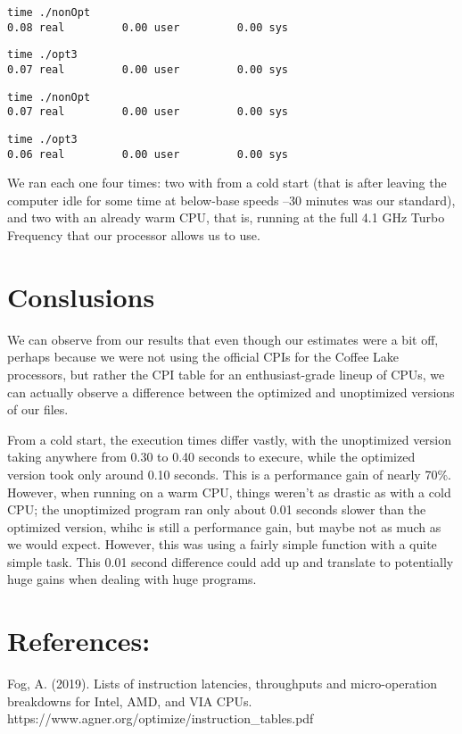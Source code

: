 \documentclass[a4paper]{article}
\begin{document}
\begin{lstlisting}
time ./nonOpt
0.08 real         0.00 user         0.00 sys
\end{lstlisting} 

\begin{lstlisting}
time ./opt3
0.07 real         0.00 user         0.00 sys
\end{lstlisting} 

\begin{lstlisting}
time ./nonOpt
0.07 real         0.00 user         0.00 sys
\end{lstlisting} 

\begin{lstlisting}
time ./opt3
0.06 real         0.00 user         0.00 sys
\end{lstlisting}

We ran each one four times: two with from a cold start (that is after leaving the computer idle for some time at below-base speeds 
--30 minutes was our standard), and two with an already warm CPU, that is, running at the full 4.1 GHz Turbo Frequency that our processor 
allows us to use.

\section{Conslusions}

We can observe from our results that even though our estimates were a bit off, perhaps because we were not using the official CPIs for the
Coffee Lake processors, but rather the CPI table for an enthusiast-grade lineup of CPUs, we can actually observe a difference between the optimized 
and unoptimized versions of our files.

From a cold start, the execution times differ vastly, with the unoptimized version taking anywhere from 0.30 to 0.40 seconds to execure, while the 
optimized version took only around 0.10 seconds. This is a performance gain of nearly 70\%. However, when running on a warm CPU, things weren't as drastic 
as with a cold CPU; the unoptimized program ran only about 0.01 seconds slower than the optimized version, whihc is still a performance gain, but maybe 
not as much as we would expect. However, this was using a fairly simple function with a quite simple task. This 0.01 second difference could add up and 
translate to potentially huge gains when dealing with huge programs.

\section{References: }

Fog, A. (2019). Lists of instruction latencies, throughputs and micro-operation breakdowns for Intel, AMD, and VIA CPUs. https://www.agner.org/optimize/instruction_tables.pdf
\end{document}
